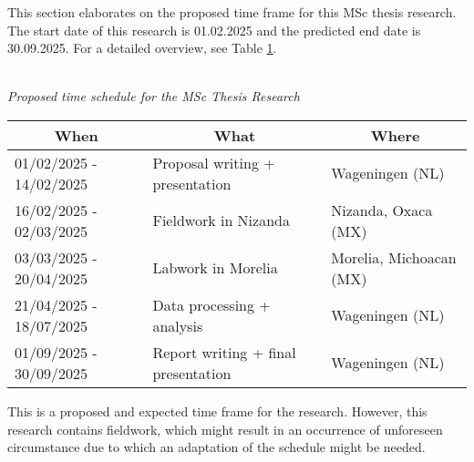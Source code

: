 

This section elaborates on the proposed time frame for this MSc thesis research. The start date of this research is 01.02.2025 and the predicted end date is 30.09.2025. For a detailed overview, see Table \ref{tab:timeschedule}.

\begin{table}[h]
\\{\textit{Proposed time schedule for the MSc Thesis Research}}\\

\begin{tabular}{lll}\hline
\multicolumn{1}{c}{\textbf{When}} & \multicolumn{1}{c}{\textbf{What}}   & \multicolumn{1}{c}{\textbf{Where}} \\\hline
01/02/2025 - 14/02/2025           & Proposal writing + presentation     & Wageningen (NL)                    \\
16/02/2025 - 02/03/2025           & Fieldwork in Nizanda                & Nizanda, Oxaca (MX)                \\
03/03/2025 - 20/04/2025           & Labwork in Morelia                  & Morelia, Michoacan (MX)            \\
21/04/2025 - 18/07/2025           & Data processing + analysis          & Wageningen (NL)                     \\

01/09/2025 - 30/09/2025           & Report writing + final presentation & Wageningen (NL)\\\hline                 
\end{tabular}\label{tab:timeschedule}
\end{table}

This is a proposed and expected time frame for the research. However, this research contains fieldwork, which might result in an occurrence of unforeseen circumstance due to which an adaptation of the schedule might be needed. 